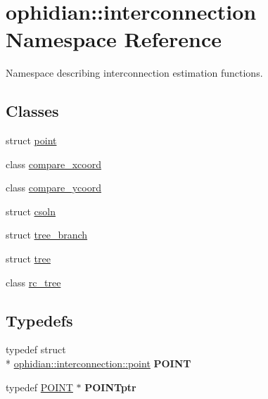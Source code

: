 \hypertarget{namespaceophidian_1_1interconnection}{\section{ophidian\-:\-:interconnection Namespace Reference}
\label{namespaceophidian_1_1interconnection}
}


Namespace describing interconnection estimation functions.  


\subsection*{Classes}
\begin{DoxyCompactItemize}
\item 
struct \hyperlink{structophidian_1_1interconnection_1_1point}{point}
\item 
class \hyperlink{classophidian_1_1interconnection_1_1compare__xcoord}{compare\-\_\-xcoord}
\item 
class \hyperlink{classophidian_1_1interconnection_1_1compare__ycoord}{compare\-\_\-ycoord}
\item 
struct \hyperlink{structophidian_1_1interconnection_1_1csoln}{csoln}
\item 
struct \hyperlink{structophidian_1_1interconnection_1_1tree__branch}{tree\-\_\-branch}
\item 
struct \hyperlink{structophidian_1_1interconnection_1_1tree}{tree}
\item 
class \hyperlink{classophidian_1_1interconnection_1_1rc__tree}{rc\-\_\-tree}
\end{DoxyCompactItemize}
\subsection*{Typedefs}
\begin{DoxyCompactItemize}
\item 
\hypertarget{namespaceophidian_1_1interconnection_ad558fdd6517bc1cadbf768a98b094598}{typedef struct \\*
\hyperlink{structophidian_1_1interconnection_1_1point}{ophidian\-::interconnection\-::point} {\bfseries P\-O\-I\-N\-T}}\label{namespaceophidian_1_1interconnection_ad558fdd6517bc1cadbf768a98b094598}

\item 
\hypertarget{namespaceophidian_1_1interconnection_a7e3d7d79eaa5920376bd14bc1124b81e}{typedef \hyperlink{structophidian_1_1interconnection_1_1point}{P\-O\-I\-N\-T} $\ast$ {\bfseries P\-O\-I\-N\-Tptr}}\label{namespaceophidian_1_1interconnection_a7e3d7d79eaa5920376bd14bc1124b81e}

\end{DoxyCompactItemize}
